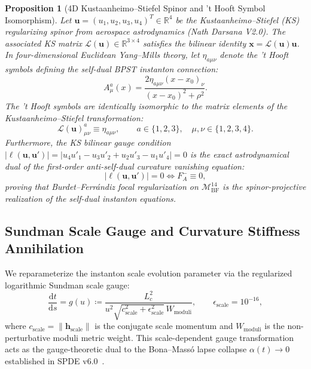 \documentclass[11pt,a4paper,reqno]{article}
\theoremstyle{plain}
\newtheorem{proposition}[theorem]{Proposition}
\theoremstyle{definition}
\theoremstyle{remark}
\numberwithin{equation}{section}
\newcommand{\Mbf}{\mathcal{M}_{\mathrm{BF}}^{14}}
\providecommand{\diff}{\mathrm{d}}
\begin{document}
\begin{proposition}[4D Kustaanheimo--Stiefel Spinor and 't Hooft Symbol Isomorphism]
\label{prop:ks_hooft_isomorphism}
Let $\bm{u} = (u_1, u_2, u_3, u_4)^T \in \mathbb{R}^4$ be the Kustaanheimo--Stiefel (KS) regularizing spinor from aerospace astrodynamics (Nath Darsana V2.0). The associated KS matrix $\mathcal{L}(\bm{u}) \in \mathbb{R}^{3 \times 4}$ satisfies the bilinear identity $\bm{x} = \mathcal{L}(\bm{u})\bm{u}$. 
In four-dimensional Euclidean Yang--Mills theory, let $\eta_{a\mu\nu}$ denote the 't Hooft symbols defining the self-dual BPST instanton connection:
\begin{equation}
  A_\mu^a(x) = \frac{2 \eta_{a\mu\nu} (x - x_0)_\nu}{(x - x_0)^2 + \rho^2}.
\end{equation}
The 't Hooft symbols are identically isomorphic to the matrix elements of the Kustaanheimo--Stiefel transformation:
\begin{equation}
  \mathcal{L}(\bm{u})_{\mu\nu}^a \equiv \eta_{a\mu\nu}, \qquad a \in \{1, 2, 3\}, \quad \mu, \nu \in \{1, 2, 3, 4\}.
\end{equation}
Furthermore, the KS bilinear gauge condition $|\ell(\bm{u}, \bm{u}')| = |u_4 u'_1 - u_3 u'_2 + u_2 u'_3 - u_1 u'_4| = 0$ is the exact astrodynamical dual of the first-order anti-self-dual curvature vanishing equation:
\begin{equation}
  |\ell(\bm{u}, \bm{u}')| = 0 \iff F_A^- \equiv 0,
\end{equation}
proving that Burdet--Ferr\'{a}ndiz focal regularization on $\Mbf$ is the spinor-projective realization of the self-dual instanton equations.
\end{proposition}

\subsection{Sundman Scale Gauge and Curvature Stiffness Annihilation}
\label{subsec:ym_sundman_freezeout}

We reparameterize the instanton scale evolution parameter via the regularized logarithmic Sundman scale gauge:
\begin{equation}
  \frac{\diff t}{\diff s} = g(u) \coloneqq \frac{L_c^2}{u^2 \sqrt{c_{\mathrm{scale}}^2 + \epsilon_{\mathrm{scale}}^2} \, W_{\mathrm{moduli}}}, \qquad \epsilon_{\mathrm{scale}} = 10^{-16},
  \label{eq:ym_sundman_gauge_reg}
\end{equation}
where $c_{\mathrm{scale}} = \|\mathbf{h}_{\mathrm{scale}}\|$ is the conjugate scale momentum and $W_{\mathrm{moduli}}$ is the non-perturbative moduli metric weight. This scale-dependent gauge transformation acts as the gauge-theoretic dual to the Bona--Mass\'o lapse collapse $\alpha(t) \to 0$ established in SPDE v6.0~\cite{SPDEV60}.
\end{document}
